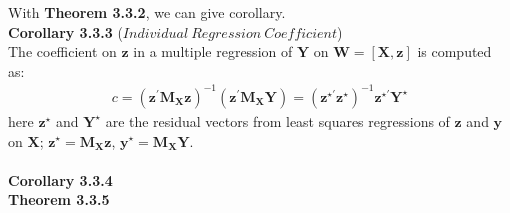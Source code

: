 \documentclass{article}
\begin{document}
\noindent
With \textbf{Theorem 3.3.2}, we can give corollary.\\
\textbf{Corollary 3.3.3} ($Individual\ Regression\ Coefficient$)\\
The coefficient on $\boldsymbol{z}$ in a multiple regression of $\boldsymbol{Y}$ on $\boldsymbol{W} = [\boldsymbol{X}, \boldsymbol{z}]$ is computed as:
	\begin{align*}
		c = (\boldsymbol{z}^\prime \boldsymbol{M}_{\boldsymbol{X}} \boldsymbol{z})^{-1} (\boldsymbol{z}^\prime \boldsymbol{M}_{\boldsymbol{X}} \boldsymbol{Y}) = (\boldsymbol{z}^{\star\prime} \boldsymbol{z}^\star)^{-1} \boldsymbol{z}^{\star\prime} \boldsymbol{Y}^\star
	\end{align*}
here $\boldsymbol{z}^\star$ and $\boldsymbol{Y}^\star$ are the residual vectors from least squares regressions of $\boldsymbol{z}$ and $\boldsymbol{y}$ on $\boldsymbol{X}$; $\boldsymbol{z}^\star = \boldsymbol{M}_{\boldsymbol{X}} \boldsymbol{z}$, $\boldsymbol{y}^\star = \boldsymbol{M}_{\boldsymbol{X}} \boldsymbol{Y}$.\\\\
\textbf{Corollary 3.3.4}\\
\textbf{Theorem 3.3.5}
\end{document}
